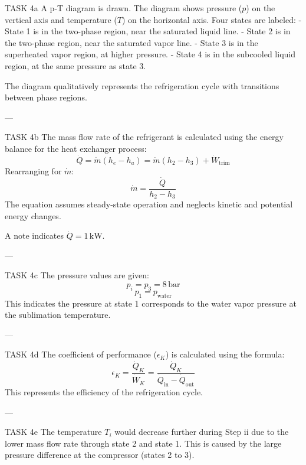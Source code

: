 TASK 4a  
A p-T diagram is drawn. The diagram shows pressure (\( p \)) on the vertical axis and temperature (\( T \)) on the horizontal axis. Four states are labeled:  
- State 1 is in the two-phase region, near the saturated liquid line.  
- State 2 is in the two-phase region, near the saturated vapor line.  
- State 3 is in the superheated vapor region, at higher pressure.  
- State 4 is in the subcooled liquid region, at the same pressure as state 3.  

The diagram qualitatively represents the refrigeration cycle with transitions between phase regions.

---

TASK 4b  
The mass flow rate of the refrigerant is calculated using the energy balance for the heat exchanger process:  
\[
\dot{Q} = \dot{m} \left( h_e - h_a \right) = \dot{m} \left( h_2 - h_3 \right) + \dot{W}_{\text{trim}}
\]  
Rearranging for \( \dot{m} \):  
\[
\dot{m} = \frac{\dot{Q}}{h_2 - h_3}
\]  
The equation assumes steady-state operation and neglects kinetic and potential energy changes.  

A note indicates \( \dot{Q} = 1 \, \text{kW} \).

---

TASK 4c  
The pressure values are given:  
\[
p_i = p_3 = 8 \, \text{bar}
\]  
\[
p_1 = p_{\text{water}}
\]  
This indicates the pressure at state 1 corresponds to the water vapor pressure at the sublimation temperature.

---

TASK 4d  
The coefficient of performance (\( \epsilon_K \)) is calculated using the formula:  
\[
\epsilon_K = \frac{\dot{Q}_K}{\dot{W}_K} = \frac{\dot{Q}_K}{\dot{Q}_{\text{in}} - \dot{Q}_{\text{out}}}
\]  
This represents the efficiency of the refrigeration cycle.

---

TASK 4e  
The temperature \( T_i \) would decrease further during Step ii due to the lower mass flow rate through state 2 and state 1. This is caused by the large pressure difference at the compressor (states 2 to 3).